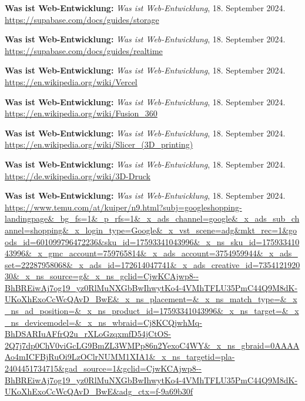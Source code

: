 \begin{literature}
\textbf{Was ist Web-Entwicklung:} \textit{Was ist Web-Entwicklung}, 18. September 2024. \url{https://supabase.com/docs/guides/storage}

\textbf{Was ist Web-Entwicklung:} \textit{Was ist Web-Entwicklung}, 18. September 2024. \url{https://supabase.com/docs/guides/realtime}

\textbf{Was ist Web-Entwicklung:} \textit{Was ist Web-Entwicklung}, 18. September 2024. \url{https://en.wikipedia.org/wiki/Vercel}

\textbf{Was ist Web-Entwicklung:} \textit{Was ist Web-Entwicklung}, 18. September 2024. \url{https://en.wikipedia.org/wiki/Fusion_360}

\textbf{Was ist Web-Entwicklung:} \textit{Was ist Web-Entwicklung}, 18. September 2024. \url{https://en.wikipedia.org/wiki/Slicer_(3D_printing)}

\textbf{Was ist Web-Entwicklung:} \textit{Was ist Web-Entwicklung}, 18. September 2024. \url{https://de.wikipedia.org/wiki/3D-Druck}













\textbf{Was ist Web-Entwicklung:} \textit{Was ist Web-Entwicklung}, 18. September 2024. \url{https://www.temu.com/at/kuiper/n9.html?subj=googleshopping-landingpage&_bg_fs=1&_p_rfs=1&_x_ads_channel=google&_x_ads_sub_channel=shopping&_x_login_type=Google&_x_vst_scene=adg&mkt_rec=1&goods_id=601099796472236&sku_id=17593341043996&_x_ns_sku_id=17593341043996&_x_gmc_account=759765814&_x_ads_account=3754959944&_x_ads_set=22287958068&_x_ads_id=172614047741&_x_ads_creative_id=735412192030&_x_ns_source=g&_x_ns_gclid=CjwKCAjwp8--BhBREiwAj7og19_yz0RlMuNXGbBwIhwytKo4-4VMhTFLU35PmC44Q9M8dK-UKoXhExoCcWcQAvD_BwE&_x_ns_placement=&_x_ns_match_type=&_x_ns_ad_position=&_x_ns_product_id=17593341043996&_x_ns_target=&_x_ns_devicemodel=&_x_ns_wbraid=Cj8KCQjwhMq-BhDSARIuAFfrQ2u_rXLoGzqxmfD54jCtOS-2Q7j7dp0ChV0viGcLG9BmZL3WMPp86n2YexoC4WY&_x_ns_gbraid=0AAAAAo4mICFBjRuOi9LzOClrNUMM1XIA1&_x_ns_targetid=pla-2404451734715&gad_source=1&gclid=CjwKCAjwp8--BhBREiwAj7og19_yz0RlMuNXGbBwIhwytKo4-4VMhTFLU35PmC44Q9M8dK-UKoXhExoCcWcQAvD_BwE&adg_ctx=f-9a69b30f}


\end{literature}
